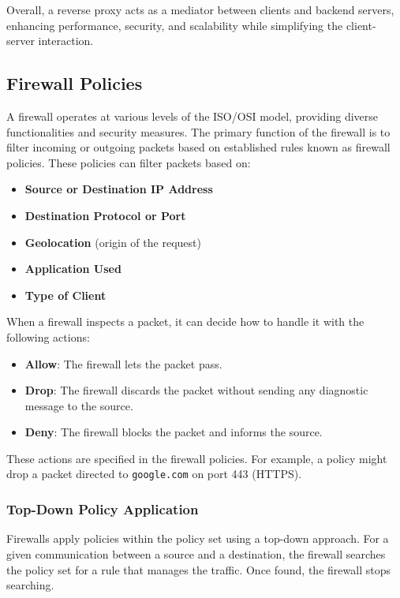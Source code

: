 Overall, a reverse proxy acts as a mediator between clients and backend servers, enhancing performance, security, and scalability while simplifying the client-server interaction.

\subsection{Firewall Policies}

A firewall operates at various levels of the ISO/OSI model, providing diverse functionalities and security measures. The primary function of the firewall is to filter incoming or outgoing packets based on established rules known as firewall policies. These policies can filter packets based on:

\begin{itemize}
    \item \textbf{Source or Destination IP Address}
    \item \textbf{Destination Protocol or Port}
    \item \textbf{Geolocation} (origin of the request)
    \item \textbf{Application Used}
    \item \textbf{Type of Client}
\end{itemize}

When a firewall inspects a packet, it can decide how to handle it with the following actions:

\begin{itemize}
    \item \textbf{Allow}: The firewall lets the packet pass.
    \item \textbf{Drop}: The firewall discards the packet without sending any diagnostic message to the source.
    \item \textbf{Deny}: The firewall blocks the packet and informs the source.
\end{itemize}

These actions are specified in the firewall policies. For example, a policy might drop a packet directed to \texttt{google.com} on port 443 (HTTPS).

\subsubsection{Top-Down Policy Application}

Firewalls apply policies within the policy set using a top-down approach. For a given communication between a source and a destination, the firewall searches the policy set for a rule that manages the traffic. Once found, the firewall stops searching.

